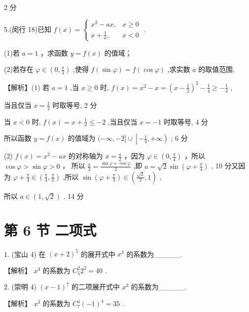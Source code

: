 \documentclass[10pt]{article}
\begin{document}
2 分

5.(闵行 18)已知 \(f\left( x\right)  = \left\{  \begin{array}{ll} {x}^{2} - {ax}, & x \geq  0 \\  x + \frac{1}{x}, & x < 0 \end{array}\right.\) .

(1)若 \(a = 1\) ，求函数 \(y = f\left( x\right)\) 的值域；

(2)若存在 \(\varphi  \in  \left( {0,\frac{\pi }{4}}\right)\) ,使得 \(f\left( {\sin \varphi }\right)  = f\left( {\cos \varphi }\right)\) ,求实数 \(a\) 的取值范围.

【解析】(1) 若 \(a = 1\) ,当 \(x \geq  0\) 时, \(f\left( x\right)  = {x}^{2} - x = {\left( x - \frac{1}{2}\right) }^{2} - \frac{1}{4} \geq   - \frac{1}{4}\) ,

当且仅当 \(x = \frac{1}{2}\) 时取等号, 2 分

当 \(x < 0\) 时, \(f\left( x\right)  = x + \frac{1}{x} \leq   - 2\) ,当且仅当 \(x =  - 1\) 时取等号, 4 分

所以函数 \(y = f\left( x\right)\) 的值域为 \(( - \infty , - 2\rbrack  \cup  \left\lbrack  {-\frac{1}{4}, + \infty }\right)\) ; 6 分

(2) \(f\left( x\right)  = {x}^{2} - {ax}\) 的对称轴为 \(x = \frac{a}{2}\) ，因为 \(\varphi  \in  \left( {0,\frac{\pi }{4}}\right)\) ，所以 \(\cos \varphi  > \sin \varphi  > 0\) ， 所以 \(\frac{a}{2} = \frac{\sin \varphi  + \cos \varphi }{2}\) ,即 \(a = \sqrt{2}\sin \left( {\varphi  + \frac{\pi }{4}}\right)\) , 10 分又因为 \(\varphi  + \frac{\pi }{4} \in  \left( {\frac{\pi }{4},\frac{\pi }{2}}\right)\) ,所以 \(\sin \left( {\varphi  + \frac{\pi }{4}}\right)  \in  \left( {\frac{\sqrt{2}}{2},1}\right)\) ,

所以 \(a \in  \left( {1,\sqrt{2}}\right)\) . 14 分

\section*{第 6 节 二项式}

1. (宝山 4) 在 \({\left( x + 2\right) }^{5}\) 的展开式中 \({x}^{3}\) 的系数为\_\_\_\_\_.

【解析】 \({x}^{3}\) 的系数为 \({C}_{5}^{2}{2}^{2} = {40}\) .

2. (崇明 4) \({\left( x - 1\right) }^{7}\) 的二项展开式中 \({x}^{3}\) 的系数为\_\_\_\_\_.

【解析】 \({x}^{3}\) 的系数为 \({C}_{7}^{4}{\left( -1\right) }^{4} = {35}\) .
\end{document}
